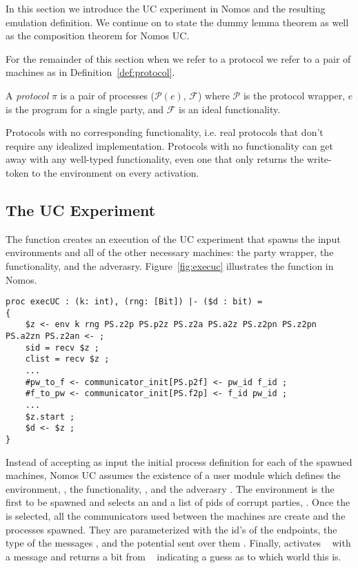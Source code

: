 In this section we introduce the UC experiment in Nomos and the resulting emulation definition.
We continue on to state the dummy lemma theorem as well as the composition theorem for Nomos UC.

For the remainder of this section when we refer to a protocol we refer to a pair of machines as in Definition~\ref{def:protocol}.

\begin{definition}\label{def:protocol}
	A \textit{protocol} $\pi$ is a pair of processes ($\mathcal{P}(e)$, $\mathcal{F}$) where $\mathcal{P}$ is the protocol wrapper, $e$ is the program for a single party, and $\mathcal{F}$ is an ideal functionality.
\end{definition}
 
Protocols with no corresponding functionality, i.e. real protocols that don't require any idealized implementation.
Protocols with no functionality can get away with any well-typed functionality, even one that only returns the write-token to the environment on every activation.


\subsection{The UC Experiment}
The  function creates an execution of the UC experiment that spawns the input environments and all of the other necessary machines: the party wrapper, the functionality, and the adverasry.
Figure~\ref{fig:execuc} illustrates the function in Nomos.

\begin{figure*}
\begin{lstlisting}[basicstyle=\small\ttfamily]
proc execUC : (k: int), (rng: [Bit]) |- ($d : bit) = 
{
    $z <- env k rng PS.z2p PS.p2z PS.z2a PS.a2z PS.z2pn PS.z2pn PS.a2zn PS.z2an <- ;
    sid = recv $z ;
    clist = recv $z ;
    ...
    #pw_to_f <- communicator_init[PS.p2f] <- pw_id f_id ;
	#f_to_pw <- communicator_init[PS.f2p] <- f_id pw_id ;
	...
    $z.start ;
    $d <- $z ;
}
\end{lstlisting}
\end{figure*}

Instead of accepting as input the initial process definition for each of the spawned machines, Nomos UC assumes the existence of a user module  which defines the environment, , the functionality, , and the adverasry .
The environment is the first to be spawned and selects an  and a list of pids of corrupt parties, .
Once the  is selected, all the communicators used between the machines are create and the processes spawned.
They are parameterized with the id's of the endpoints, the type of the messages , and the potential sent over them .
Finally,  activates \Environment~ with a  message and returns a bit from \Environment~ indicating a guess as to which world this is.

